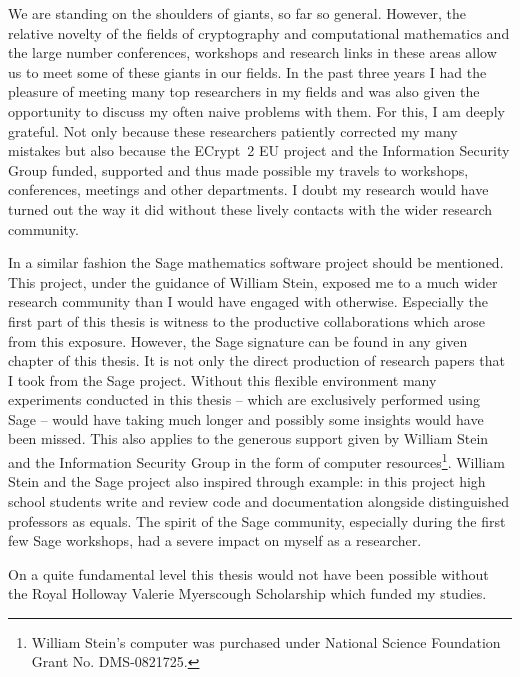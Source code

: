 We are standing on the shoulders of giants, so far so general. However, the relative novelty of the fields of cryptography and computational mathematics and the large number conferences, workshops and research links in these areas allow us to meet some of these giants in our fields. In the past three years I had the pleasure of meeting many top researchers in my fields and was also given the opportunity to discuss my often naive problems with them. For this, I am deeply grateful. Not only because these researchers patiently corrected my many mistakes but also because the ECrypt~2 EU project and the Information Security Group funded, supported and thus made possible my travels to workshops, conferences, meetings and other departments. I doubt my research would have turned out the way it did without these lively contacts with the wider research community. 

In a similar fashion the Sage mathematics software project should be mentioned. This project, under the guidance of William Stein, exposed me to a much wider research community than I would have engaged with otherwise. Especially the first part of this thesis is witness to the productive collaborations which arose from this exposure. However, the Sage signature can be found in any given chapter of this thesis. It is not only the direct production of research papers that I took from the Sage project. Without this flexible environment many experiments conducted in this thesis -- which are exclusively performed using Sage -- would have taking much longer and possibly some insights would have been missed. This also applies to the generous support given by William Stein and the Information Security Group in the form of computer resources\footnote{William Stein's computer was purchased under National Science Foundation Grant No. DMS-0821725.}. William Stein and the Sage project also inspired through example: in this project high school students write and review code and documentation alongside distinguished professors as equals. The spirit of the Sage community, especially during the first few Sage workshops, had a severe impact on myself as a researcher.

On a quite fundamental level this thesis would not have been possible without the Royal Holloway Valerie Myerscough Scholarship which funded my studies.

